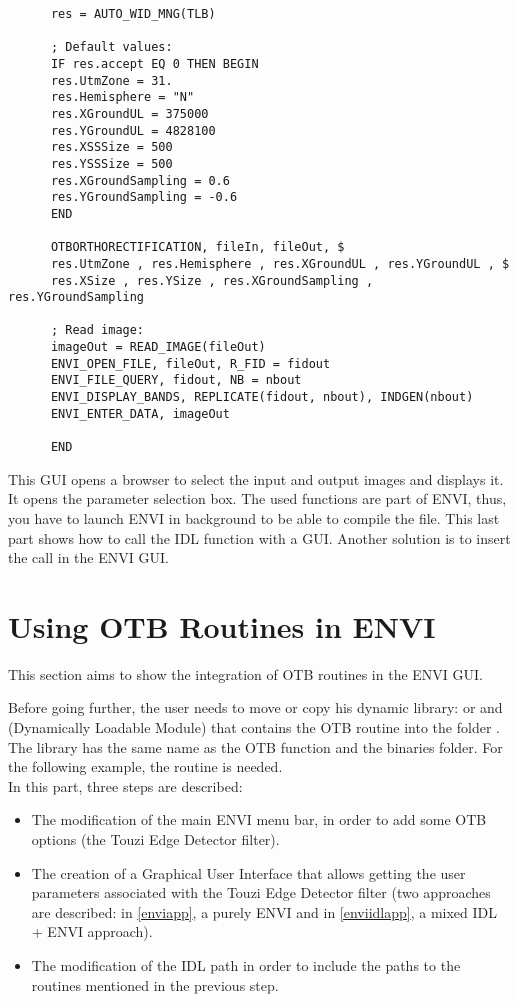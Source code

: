 \begin{verbatim}
      res = AUTO_WID_MNG(TLB)

      ; Default values:
      IF res.accept EQ 0 THEN BEGIN
      res.UtmZone = 31.
      res.Hemisphere = "N"
      res.XGroundUL = 375000
      res.YGroundUL = 4828100
      res.XSSSize = 500
      res.YSSSize = 500
      res.XGroundSampling = 0.6
      res.YGroundSampling = -0.6
      END

      OTBORTHORECTIFICATION, fileIn, fileOut, $
      res.UtmZone , res.Hemisphere , res.XGroundUL , res.YGroundUL , $
      res.XSize , res.YSize , res.XGroundSampling , res.YGroundSampling 

      ; Read image:
      imageOut = READ_IMAGE(fileOut)
      ENVI_OPEN_FILE, fileOut, R_FID = fidout
      ENVI_FILE_QUERY, fidout, NB = nbout
      ENVI_DISPLAY_BANDS, REPLICATE(fidout, nbout), INDGEN(nbout)
      ENVI_ENTER_DATA, imageOut

      END
\end{verbatim}
This GUI opens a browser to select the input and output images and displays it. It opens the parameter selection box. The used functions are part of ENVI, thus, you have to launch ENVI in background to be able to compile the file. This last part shows how to call the IDL function with a GUI. Another solution is to insert the call in the ENVI GUI.


\section{Using OTB Routines in ENVI}
\label{envi}
This section aims to show the integration of OTB routines in the ENVI GUI.

Before going further, the user needs to move or copy his dynamic library:  or  and  (Dynamically Loadable Module) 
that contains the OTB routine into the folder  .\\
The library has the same name as the OTB function and the binaries folder. For the following example, the  routine is needed.\\
In this part, three steps are described:
\begin{itemize}
    \item The modification of the main ENVI menu bar, in order to add some OTB options (the Touzi Edge Detector filter).
    \item The creation of a Graphical User Interface that allows getting the user parameters associated with the Touzi Edge Detector filter
    (two approaches are described: in \ref{enviapp}, a  purely ENVI  and in \ref{enviidlapp}, a  mixed IDL + ENVI  approach).
    \item The modification of the IDL path in order to include the paths to the routines mentioned in the previous step. 
\end{itemize}

